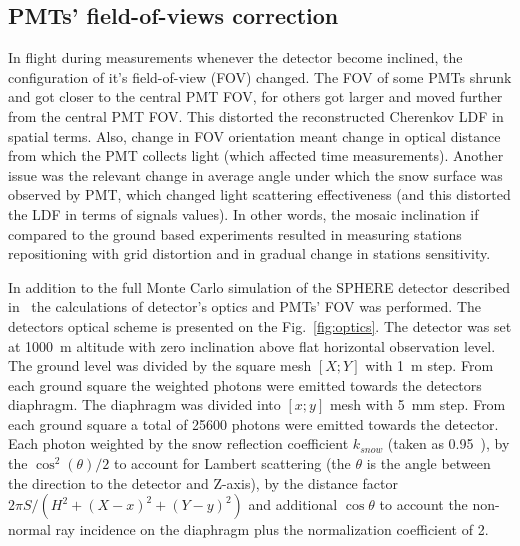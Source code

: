 \documentclass[final,5p,times,twocolumn]{elsarticle}
\begin{document}
\subsection{PMTs' field-of-views correction}

In flight during measurements whenever the detector become inclined, the configuration of it's field-of-view (FOV) changed. The FOV of some PMTs shrunk and got closer to the central PMT FOV, for others got larger and moved further from the central PMT FOV. This distorted the reconstructed Cherenkov LDF in spatial terms. Also, change in FOV orientation meant change in optical distance from which the PMT collects light (which affected time measurements). Another issue was the relevant change in average angle under which the snow surface was observed by PMT, which changed light scattering effectiveness (and this distorted the LDF in terms of signals values). In other words, the mosaic inclination if compared to the ground based experiments resulted in measuring stations repositioning with grid distortion and in gradual change in stations sensitivity.

In addition to the full Monte Carlo simulation of the SPHERE detector described in~\cite{Ant19} the calculations of detector's optics and PMTs' FOV was performed. The detectors optical scheme is presented on the Fig.~\ref{fig:optics}. %
The detector was set at 1000~m altitude with zero inclination above flat horizontal observation level. The ground level was divided by the square mesh $[X;Y]$ with 1~m step. From each ground square the weighted photons were emitted towards the detectors diaphragm. The diaphragm was divided into $[x;y]$ mesh with 5~mm step. From each ground square a total of 25600 photons were emitted towards the detector. Each photon weighted by the snow reflection coefficient $k_{snow}$ (taken as 0.95~\cite{war82}), by the $\cos^2(\theta)/2$ to account for Lambert scattering (the $\theta$ is the angle between the direction to the detector and Z-axis), by the distance factor $2\pi{}S/(H^2+(X-x)^2+(Y-y)^2)$ and additional $\cos\theta$ to account the non-normal ray incidence on the diaphragm {\color{red}plus} the normalization coefficient of 2.
\end{document}
